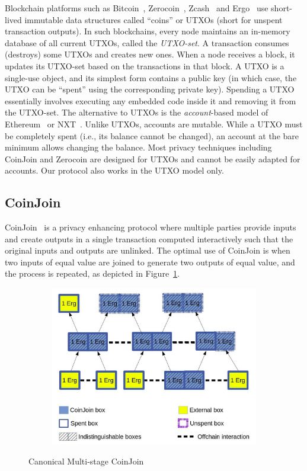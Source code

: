 \documentclass[runningheads]{llncs}
\newcommand{\zerocoin}{Zerocoin\xspace}
\begin{document}
Blockchain platforms such as Bitcoin~\cite{Nak08}, \zerocoin~\cite{zerocoin}, Zcash~\cite{zcash} and Ergo~\cite{ergo} use short-lived immutable data structures called ``coins'' or UTXOs (short for {unspent transaction outputs}). In such blockchains, every node maintains an in-memory database of all current UTXOs, called the {\em UTXO-set}. A transaction consumes (destroys) some UTXOs and creates new ones. When a node receives a block, it updates its UTXO-set based on the transactions in that block. A UTXO is a single-use object, and its simplest form contains a public key (in which case, the UTXO can be ``spent'' using the corresponding private key). Spending a UTXO essentially involves executing any embedded code inside it and removing it from the UTXO-set. 
The alternative to UTXOs is the {\em account}-based model of Ethereum~\cite{wood2014ethereum} or NXT~\cite{nxt}. Unlike UTXOs, accounts are mutable. While a UTXO must be completely spent (i.e., its balance cannot be changed), an account at the bare minimum allows changing the balance. Most privacy techniques including CoinJoin and \zerocoin are designed for UTXOs and cannot be easily adapted for accounts. Our protocol also works in the UTXO model only. 

\subsection{CoinJoin} 
\label{coinjoin}
CoinJoin~\cite{coinjoin} is a privacy enhancing protocol where multiple parties provide inputs and create outputs in a single transaction computed interactively such that the original inputs and outputs are unlinked. The optimal use of CoinJoin is when two inputs of equal value are joined to generate two outputs of equal value, and the process is repeated, as depicted in Figure~\ref{fig:coinjoin}. 

\begin{figure}[h]
	\centering
	\begin{subfigure}{.575\textwidth}
		\centering
		\includegraphics[width=\linewidth]{CoinJoin.jpg}
	\end{subfigure}%
	\caption{Canonical Multi-stage CoinJoin}
	\label{fig:coinjoin}
\end{figure}
\end{document}
